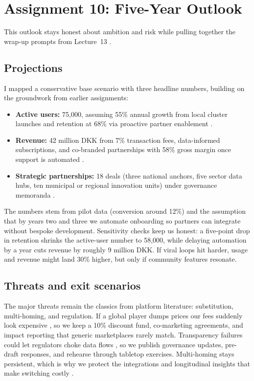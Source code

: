 \section*{Assignment 10: Five-Year Outlook}

This outlook stays honest about ambition and risk while pulling together the wrap-up prompts from Lecture~13 \citep{Lecture13}.

\subsection*{Projections}
I mapped a conservative base scenario with three headline numbers, building on the groundwork from earlier assignments:
\begin{itemize}
  \item \textbf{Active users:} 75,000, assuming 55\% annual growth from local cluster launches and retention at 68\% via proactive partner enablement \citep{Choudary2016,Srnicek2017}.
  \item \textbf{Revenue:} 42 million DKK from 7\% transaction fees, data-informed subscriptions, and co-branded partnerships with 58\% gross margin once support is automated \citep{ShapiroVarian1999}.
  \item \textbf{Strategic partnerships:} 18 deals (three national anchors, five sector data hubs, ten municipal or regional innovation units) under governance memoranda \citep{Reillier2017}.
\end{itemize}

The numbers stem from pilot data (conversion around 12\%) and the assumption that by years two and three we automate onboarding so partners can integrate without bespoke development. Sensitivity checks keep us honest: a five-point drop in retention shrinks the active-user number to 58,000, while delaying automation by a year cuts revenue by roughly 9 million DKK. If viral loops hit harder, usage and revenue might land 30\% higher, but only if community features resonate.

\subsection*{Threats and exit scenarios}
The major threats remain the classics from platform literature: substitution, multi-homing, and regulation. If a global player dumps prices our fees suddenly look expensive \citep{Porter2008}, so we keep a 10\% discount fund, co-marketing agreements, and impact reporting that generic marketplaces rarely match. Transparency failures could let regulators choke data flows \citep{Srnicek2017}, so we publish governance updates, pre-draft responses, and rehearse through tabletop exercises. Multi-homing stays persistent, which is why we protect the integrations and longitudinal insights that make switching costly \citep{FarrellSaloner1986}.

